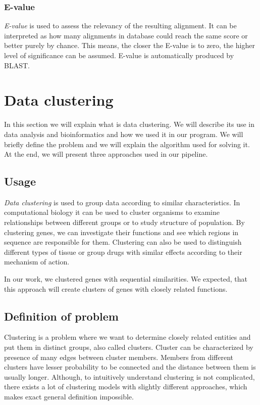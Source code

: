 \subsubsection{E-value}
\emph{E-value} is used to assess the relevancy of the resulting alignment.
It can be interpreted as how many alignments in database could reach the same score or better purely by chance.
This means, the closer the E-value is to zero, the higher level of significance can be assumed.
E-value is automatically produced by BLAST.

\section{Data clustering}
In this section we will explain what is data clustering.
We will describe its use in data analysis and bioinformatics and how we used it in our program.
We will briefly define the problem and we will explain the algorithm used for solving it.
At the end, we will present three approaches used in our pipeline.

\subsection{Usage}
\emph{Data clustering} is used to group data according to similar characteristics.
In computational biology it can be used to cluster organisms to examine relationships between different groups or to study structure of population.
By clustering genes, we can investigate their functions and see which regions in sequence are responsible for them.
Clustering can also be used to distinguish different types of tissue or group drugs with similar effects according to their mechanism of action.

In our work, we clustered genes with sequential similarities.
We expected, that this approach will create clusters of genes with closely related functions.

\subsection{Definition of problem}
Clustering is a problem where we want to determine closely related entities and put them in distinct groups, also called clusters.
Cluster can be characterized by presence of many edges between cluster members.
Members from different clusters have lesser probability to be connected and the distance between them is usually longer.
Although, to intuitively understand clustering is not complicated, there exists a lot of clustering models with slightly different approaches, which makes exact general definition impossible.


